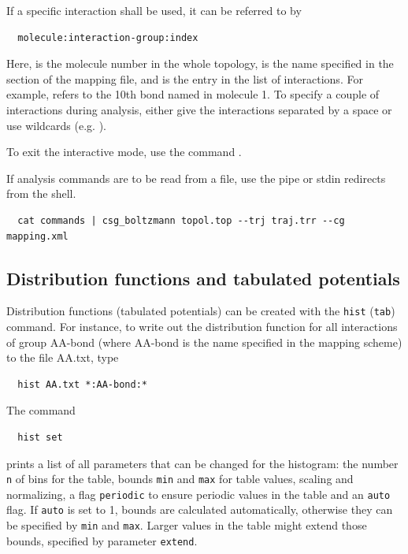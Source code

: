 If a specific interaction shall be used, it can be referred to by
\begin{verbatim}
  molecule:interaction-group:index
\end{verbatim}
Here,  is the molecule number in the whole topology,  is the name specified in the  section of the mapping file, and  is the entry in the list of interactions. For example,  refers to the 10th bond named  in molecule 1. To specify a couple of interactions during analysis, either give the interactions separated by a space or use wildcards (e.g. ).

To exit the interactive mode, use the command . 

If analysis commands are to be read from a file, use the pipe or stdin redirects from the shell.
\begin{verbatim}
  cat commands | csg_boltzmann topol.top --trj traj.trr --cg mapping.xml
\end{verbatim}

\subsection{Distribution functions and tabulated potentials}
Distribution functions (tabulated potentials) can be created with the \texttt{hist} (\texttt{tab}) command.
For instance, to write out the distribution function for all interactions of group AA-bond (where AA-bond is the name specified in the mapping scheme) to the file AA.txt, type
\begin{verbatim}
  hist AA.txt *:AA-bond:*
\end{verbatim}
The command
\begin{verbatim}
  hist set
\end{verbatim}
prints a list of all parameters that can be changed for the histogram: the number \texttt{n} of bins for the table, bounds \texttt{min} and \texttt{max} for table values, scaling and normalizing, a flag \texttt{periodic} to ensure periodic values in the table and an \texttt{auto} flag. If \texttt{auto} is set to 1, bounds are calculated automatically, otherwise they can be specified by \texttt{min} and \texttt{max}. Larger values in the table might extend those bounds, specified by parameter \texttt{extend}.

